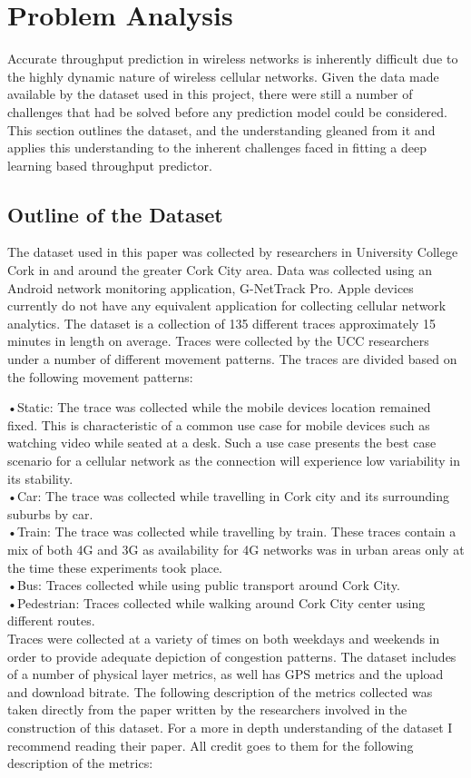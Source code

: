 \chapter{Problem Analysis}
Accurate throughput prediction in wireless networks is inherently difficult due to the highly dynamic nature of wireless cellular networks. Given the data made available by the dataset used in this project, there were still a number of challenges that had be solved before any prediction model could be considered. This section outlines the dataset, and the understanding gleaned from it and applies this understanding to the inherent challenges faced in fitting a deep learning based throughput predictor.

\section{Outline of the Dataset}
The dataset used in this paper was collected by researchers in University College Cork in and around the greater Cork City area. Data was collected using an Android network monitoring application, G-NetTrack Pro. Apple devices currently do not have any equivalent application for collecting cellular network analytics. The dataset is a collection of 135 different traces approximately 15 minutes in length on average. Traces were collected by the UCC researchers under a number of different movement patterns. The traces are divided based on the following movement patterns:

•Static: The trace was collected while the mobile devices location remained fixed. This is characteristic of a common use case for mobile devices such as watching video while seated at a desk. Such a use case presents the best case scenario for a cellular network as the connection will experience low variability in its stability. \\
•Car: The trace was collected while travelling in Cork city and its surrounding suburbs by car. \\
•Train: The trace was collected while travelling by train. These traces contain a mix of both 4G and 3G as availability for 4G networks was in urban areas only at the time these experiments took place. \\
•Bus: Traces collected while using public transport around Cork City. \\
•Pedestrian: Traces collected while walking around Cork City center using different routes. \\

Traces were collected at a variety of times on both weekdays and weekends in order to provide adequate depiction of congestion patterns. The dataset includes of a number of physical layer metrics, as well has GPS metrics and the upload and download bitrate. The following description of the metrics collected was taken directly from the paper \cite{dataset} written by the researchers involved in the construction of this dataset. For a more in depth understanding of the dataset I recommend reading their paper. All credit goes to them for the following description of the metrics:

